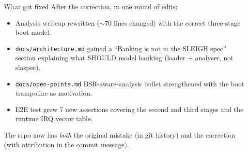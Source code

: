 \documentclass[aspectratio=169,11pt]{beamer}
\begin{document}
\begin{frame}{What got fixed}
After the correction, in one round of edits:
\begin{itemize}
  \item Analysis writeup rewritten ($\sim$70 lines changed) with the
        correct three-stage boot model.
  \item \texttt{docs/architecture.md} gained a ``Banking is not in the
        SLEIGH spec'' section explaining what SHOULD model banking
        (loader + analyser, not slaspec).
  \item \texttt{docs/open-points.md} BSR-aware-analysis bullet
        strengthened with the boot trampoline as motivation.
  \item E2E test grew 7 new assertions covering the second and third
        stages and the runtime IRQ vector table.
\end{itemize}
\vspace{0.6em}

The repo now has \emph{both} the original mistake (in git history) and
the correction (with attribution in the commit message).
\end{frame}

\end{document}
